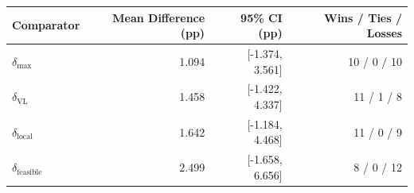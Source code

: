 \begin{tabular}{lrrr}
\toprule
Comparator & Mean Difference (pp) & 95\% CI (pp) & Wins / Ties / Losses \\
\midrule
$\delta_{\mathrm{max}}$ & 1.094 & [-1.374, 3.561] & 10 / 0 / 10 \\
$\delta_{\mathrm{VL}}$ & 1.458 & [-1.422, 4.337] & 11 / 1 / 8 \\
$\delta_{\mathrm{local}}$ & 1.642 & [-1.184, 4.468] & 11 / 0 / 9 \\
$\delta_{\mathrm{feasible}}$ & 2.499 & [-1.658, 6.656] & 8 / 0 / 12 \\
\bottomrule
\end{tabular}
